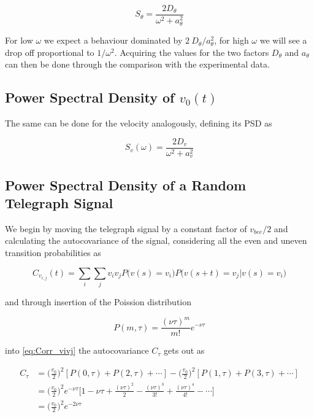 \begin{equation}
    S_{\theta} = \frac{2D_{\theta}}{\omega^{2}+a_{\theta}^{2}}
\end{equation}

For low $\omega$ we expect a behaviour dominated by $2\ D_{\theta}/a_{\theta}^{2}$, for high $\omega$ we will see a drop off proportional to $1/\omega^{2}$. Acquiring the values for the two factors $D_{\theta}$ and $a_{\theta}$ can then be done through the comparison with the experimental data.

\subsection{Power Spectral Density of $v_{0}(t)$}

The same can be done for the velocity analogously, defining its PSD as 

\begin{equation}
\label{eq:PSD_velocity}
    S_{v}(\omega) = \frac{2D_{v}}{\omega^{2}+a_{v}^{2}}
\end{equation}

\subsection{Power Spectral Density of a Random Telegraph Signal}
\label{sec:RTS}

We begin by moving the telegraph signal by a constant factor of $v_{bee}/2$ and calculating the autocovariance of the signal, considering all the even and uneven transition probabilities as

\begin{equation}
\label{eq:Corr_vivj}
    C_{v_{i,j}}(t)=\sum\limits_{i}\sum\limits_{j}v_{i}v_{j}P\Big(v(s)=v_{i}\Big)P\Big(v(s+t) = v_{j}\Big| v(s)=v_{i}\Big)
\end{equation}

and through insertion of the Poission distribution

\begin{equation}
\label{eq:Poisson}
    P(m,\tau) = \frac{(\nu \tau) ^ {m}}{m!} e^{-\nu \tau} 
\end{equation}

into \ref{eq:Corr_vivj} the autocovariance $C_{\tau}$ gets out as

\begin{equation} 
\label{eq:Covariance}
\begin{split}
C_{\tau} & = \Big(\frac{v_{0}}{2}\Big)^2 [P(0,\tau) + P(2,\tau) + \cdots ] - \Big(\frac{v_{0}}{2}\Big)^2 [P(1,\tau) + P(3,\tau) + \cdots ] \\
         & = \Big(\frac{v_{0}}{2}\Big)^2 e^{-\nu \tau} \Big[1 - \nu \tau + \frac{(\nu \tau)^2}{2} - \frac{(\nu \tau)^3}{3!} + \frac{(\nu \tau)^4}{4!} - \cdots \Big] \\
         & = \Big(\frac{v_{0}}{2}\Big)^2 e^{-2 \nu \tau}
\end{split}
\end{equation}

